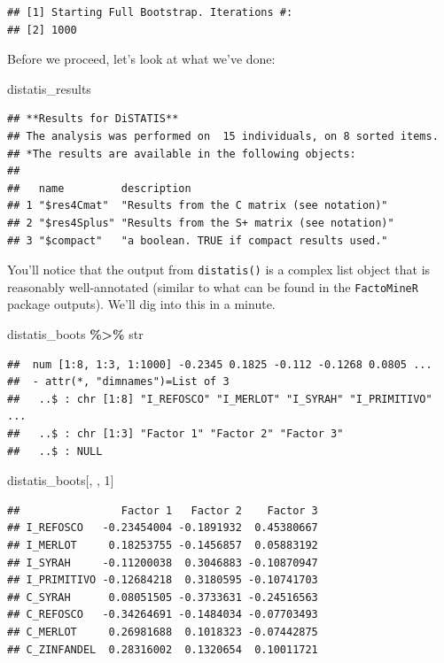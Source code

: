 \documentclass[
]{book}
\newenvironment{Shaded}{\begin{snugshade}}{\end{snugshade}}
\newcommand{\DecValTok}[1]{\textcolor[rgb]{0.00,0.00,0.81}{#1}}
\newcommand{\NormalTok}[1]{#1}
\newcommand{\SpecialCharTok}[1]{\textcolor[rgb]{0.81,0.36,0.00}{\textbf{#1}}}
\begin{document}
\begin{verbatim}
## [1] Starting Full Bootstrap. Iterations #: 
## [2] 1000
\end{verbatim}

Before we proceed, let's look at what we've done:

\begin{Shaded}
\begin{Highlighting}[]
\NormalTok{distatis\_results}
\end{Highlighting}
\end{Shaded}

\begin{verbatim}
## **Results for DiSTATIS**
## The analysis was performed on  15 individuals, on 8 sorted items.
## *The results are available in the following objects:
## 
##   name         description                                
## 1 "$res4Cmat"  "Results from the C matrix (see notation)" 
## 2 "$res4Splus" "Results from the S+ matrix (see notation)"
## 3 "$compact"   "a boolean. TRUE if compact results used."
\end{verbatim}

You'll notice that the output from \texttt{distatis()} is a complex list object that is reasonably well-annotated (similar to what can be found in the \texttt{FactoMineR} package outputs). We'll dig into this in a minute.

\begin{Shaded}
\begin{Highlighting}[]
\NormalTok{distatis\_boots }\SpecialCharTok{\%\textgreater{}\%}\NormalTok{ str}
\end{Highlighting}
\end{Shaded}

\begin{verbatim}
##  num [1:8, 1:3, 1:1000] -0.2345 0.1825 -0.112 -0.1268 0.0805 ...
##  - attr(*, "dimnames")=List of 3
##   ..$ : chr [1:8] "I_REFOSCO" "I_MERLOT" "I_SYRAH" "I_PRIMITIVO" ...
##   ..$ : chr [1:3] "Factor 1" "Factor 2" "Factor 3"
##   ..$ : NULL
\end{verbatim}

\begin{Shaded}
\begin{Highlighting}[]
\NormalTok{distatis\_boots[, , }\DecValTok{1}\NormalTok{]}
\end{Highlighting}
\end{Shaded}

\begin{verbatim}
##                Factor 1   Factor 2    Factor 3
## I_REFOSCO   -0.23454004 -0.1891932  0.45380667
## I_MERLOT     0.18253755 -0.1456857  0.05883192
## I_SYRAH     -0.11200038  0.3046883 -0.10870947
## I_PRIMITIVO -0.12684218  0.3180595 -0.10741703
## C_SYRAH      0.08051505 -0.3733631 -0.24516563
## C_REFOSCO   -0.34264691 -0.1484034 -0.07703493
## C_MERLOT     0.26981688  0.1018323 -0.07442875
## C_ZINFANDEL  0.28316002  0.1320654  0.10011721
\end{verbatim}
\end{document}
